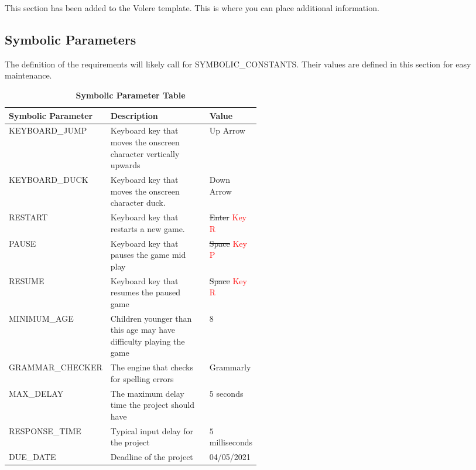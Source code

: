 \documentclass[12pt, titlepage]{article}
\begin{document}
This section has been added to the Volere template.  This is where you can place
additional information.

\subsection{Symbolic Parameters}

The definition of the requirements will likely call for SYMBOLIC\_CONSTANTS.
Their values are defined in this section for easy maintenance.
\begin{table}[h]
\caption{\bf Symbolic Parameter Table}
\begin{tabular}{|l|p{0.5\linewidth}|l|}
\hline
\multicolumn{1}{|l}{\bfseries Symbolic Parameter} & \multicolumn{1}{|l|}{\bfseries Description} & \multicolumn{1}{l|}{\bfseries Value}\\
\hline
KEYBOARD\_JUMP & Keyboard key that moves the onscreen character vertically upwards & Up Arrow \\
\hline
KEYBOARD\_DUCK & Keyboard key that moves the onscreen character duck. & Down Arrow \\
\hline
RESTART & Keyboard key that restarts a new game. & \sout{Enter} \textcolor{red}{Key R}\\
\hline
PAUSE & Keyboard key that pauses the game mid play & \sout{Space} \textcolor{red}{Key P}\\
\hline
RESUME & Keyboard key that resumes the paused game & \sout{Space} \textcolor{red}{Key R}\\
\hline
MINIMUM\_AGE & Children younger than this age may have difficulty playing the game & 8\\
\hline
GRAMMAR\_CHECKER & The engine that checks for spelling errors & Grammarly\\
\hline
MAX\_DELAY & The maximum delay time the project should have & $5$ seconds\\
\hline
RESPONSE\_TIME & Typical input delay for the project & $5$ milliseconds\\
\hline
DUE\_DATE & Deadline of the project & 04/05/2021\\
\hline
\end{tabular}
\end{table}
\end{document}

